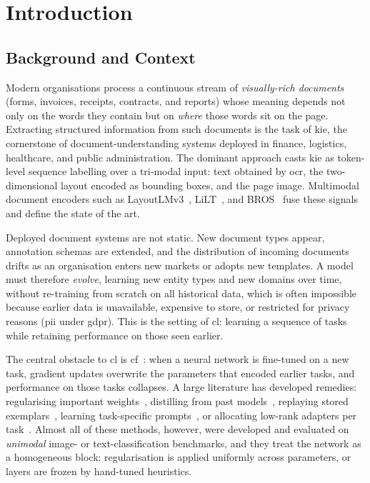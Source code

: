 \chapter{Introduction}
\label{ch:introduction}

\section{Background and Context}
\label{sec:intro-background}

Modern organisations process a continuous stream of \emph{visually-rich
documents} (forms, invoices, receipts, contracts, and reports) whose meaning
depends not only on the words they contain but on \emph{where} those words sit on
the page. Extracting structured information from such documents is the task of
\gls{kie}, the cornerstone of document-understanding systems deployed in finance,
logistics, healthcare, and public administration. The dominant approach casts
\gls{kie} as token-level sequence labelling over a tri-modal input: text obtained
by \gls{ocr}, the two-dimensional layout encoded as bounding boxes, and the page
image. Multimodal document encoders such as LayoutLMv3~\citep{huang2022layoutlmv3},
LiLT~\citep{wang2022lilt}, and BROS~\citep{hong2022bros} fuse these signals and
define the state of the art.

Deployed document systems are not static. New document types appear, annotation
schemas are extended, and the distribution of incoming documents drifts as an
organisation enters new markets or adopts new templates. A model must therefore
\emph{evolve}, learning new entity types and new domains over time, without
re-training from scratch on all historical data, which is often impossible because
earlier data is unavailable, expensive to store, or restricted for privacy reasons
(\gls{pii} under \gls{gdpr}). This is the setting of \gls{cl}: learning a sequence
of tasks while retaining performance on those seen earlier.

The central obstacle to \gls{cl} is \gls{cf}~\citep{mccloskey1989catastrophic}:
when a neural network is fine-tuned on a new task, gradient updates overwrite the
parameters that encoded earlier tasks, and performance on those tasks collapses. A
large literature has developed remedies: regularising important
weights~\citep{kirkpatrick2017ewc}, distilling from past models~\citep{li2017lwf},
replaying stored exemplars~\citep{rolnick2019er,buzzega2020der}, learning
task-specific prompts~\citep{wang2022l2p,wang2022dualprompt,smith2023coda}, or
allocating low-rank adapters per task~\citep{wang2023olora}. Almost all of these
methods, however, were developed and evaluated on \emph{unimodal} image- or
text-classification benchmarks, and they treat the network as a homogeneous block:
regularisation is applied uniformly across parameters, or layers are frozen by
hand-tuned heuristics.


